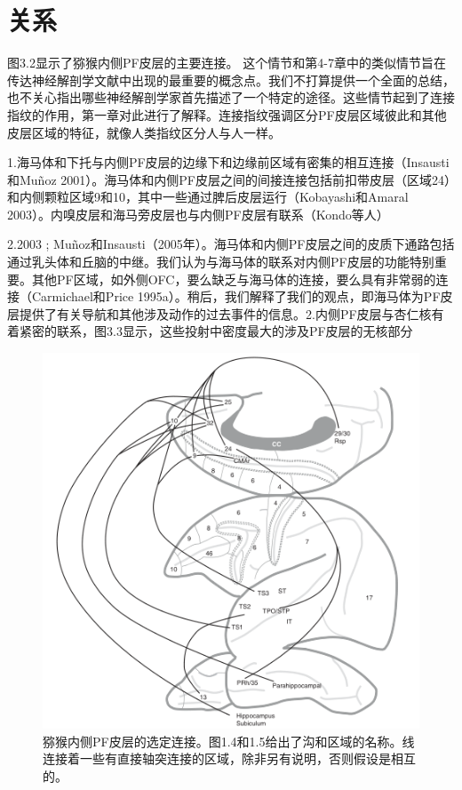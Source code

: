 \section{关系}
图3.2显示了猕猴内侧PF皮层的主要连接。
这个情节和第4-7章中的类似情节旨在传达神经解剖学文献中出现的最重要的概念点。我们不打算提供一个全面的总结，也不关心指出哪些神经解剖学家首先描述了一个特定的途径。这些情节起到了连接指纹的作用，第一章对此进行了解释。连接指纹强调区分PF皮层区域彼此和其他皮层区域的特征，就像人类指纹区分人与人一样。\par
1.海马体和下托与内侧PF皮层的边缘下和边缘前区域有密集的相互连接（Insausti和Muñoz 2001）。海马体和内侧PF皮层之间的间接连接包括前扣带皮层（区域24）和内侧颗粒区域9和10，其中一些通过脾后皮层运行（Kobayashi和Amaral 2003）。内嗅皮层和海马旁皮层也与内侧PF皮层有联系（Kondo等人）\par
2.2003 ; Muñoz和Insausti（2005年）。海马体和内侧PF皮层之间的皮质下通路包括通过乳头体和丘脑的中继。我们认为与海马体的联系对内侧PF皮层的功能特别重要。其他PF区域，如外侧OFC，要么缺乏与海马体的连接，要么具有非常弱的连接（Carmichael和Price 1995a）。稍后，我们解释了我们的观点，即海马体为PF皮层提供了有关导航和其他涉及动作的过去事件的信息。2.内侧PF皮层与杏仁核有着紧密的联系，图3.3显示，这些投射中密度最大的涉及PF皮层的无核部分\par
\begin{figure}[!htb]
	\centering
	\includegraphics{image_pfc/Fig_3_2}
	\caption{猕猴内侧PF皮层的选定连接。图1.4和1.5给出了沟和区域的名称。线连接着一些有直接轴突连接的区域，除非另有说明，否则假设是相互的。}
	\label{fig:fig}
\end{figure}
